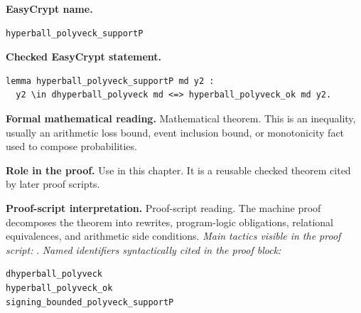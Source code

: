 \begin{formaltheorem}
\noindent\textbf{EasyCrypt name.}
\begin{lstlisting}[language=EasyCrypt,basicstyle=\ttfamily\scriptsize]
hyperball_polyveck_supportP
\end{lstlisting}
\noindent\textbf{Checked EasyCrypt statement.}
\begin{lstlisting}[language=EasyCrypt,basicstyle=\ttfamily\scriptsize]
lemma hyperball_polyveck_supportP md y2 :
  y2 \in dhyperball_polyveck md <=> hyperball_polyveck_ok md y2.
\end{lstlisting}
\noindent\textbf{Formal mathematical reading.}
Mathematical theorem. This is an inequality, usually an arithmetic loss bound, event inclusion bound, or monotonicity fact used to compose probabilities.

\noindent\textbf{Role in the proof.}
Use in this chapter. It is a reusable checked theorem cited by later proof scripts.

\noindent\textbf{Proof-script interpretation.}
Proof-script reading. The machine proof decomposes the theorem into rewrites, program-logic obligations, relational equivalences, and arithmetic side conditions.
\emph{Main tactics visible in the proof script:} .
\emph{Named identifiers syntactically cited in the proof block:}
\begin{lstlisting}[language=EasyCrypt,basicstyle=\ttfamily\scriptsize]
dhyperball_polyveck
hyperball_polyveck_ok
signing_bounded_polyveck_supportP
\end{lstlisting}

\end{formaltheorem}

